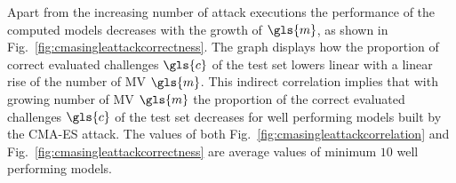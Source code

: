 Apart from the increasing number of attack executions the performance of the computed models decreases with the growth of $\gls{m}$, as shown in Fig.\ \ref{fig:cmasingleattackcorrectness}.
The graph displays how the proportion of correct evaluated challenges $\gls{c}$ of the test set lowers linear with a linear rise of the number of \ac{MV} $\gls{m}$.
This indirect correlation implies that with growing number of \ac{MV} $\gls{m}$ the proportion of the correct evaluated challenges $\gls{c}$ of the test set decreases for well performing models built by the \ac{CMA-ES} attack.
The values of both Fig.\ \ref{fig:cmasingleattackcorrelation} and Fig.\ \ref{fig:cmasingleattackcorrectness} are average values of minimum $10$ well performing models.


